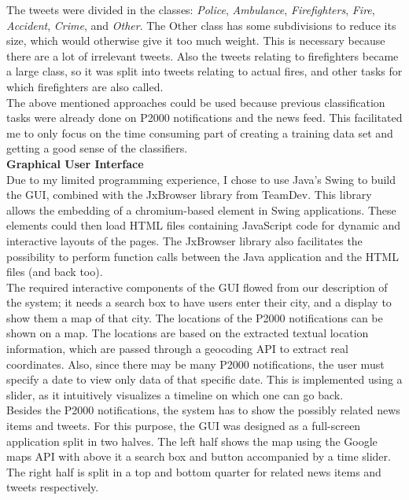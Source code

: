 The tweets were divided in the classes: \emph{Police}, \emph{Ambulance}, \emph{Firefighters}, \emph{Fire}, \emph{Accident}, \emph{Crime}, and \emph{Other}. The Other class has some subdivisions to reduce its size, which would otherwise give it too much weight. This is necessary because there are a lot of irrelevant tweets. Also the tweets relating to firefighters became a large class, so it was split into tweets relating to actual fires, and other tasks for which firefighters are also called.\\

The above mentioned approaches could be used because previous classification tasks were already done on P2000 notifications and the news feed. This facilitated me to only focus on the time consuming part of creating a training data set and getting a good sense of the classifiers.\\

\textbf{Graphical User Interface}\\
Due to my limited programming experience, I chose to use Java's Swing to build the GUI, combined with the JxBrowser library from TeamDev. This library allows the embedding of a chromium-based element in Swing applications. These elements could then load HTML files containing JavaScript code for dynamic and interactive layouts of the pages. The JxBrowser library also facilitates the possibility to perform function calls between the Java application and the HTML files (and back too).\\ 

The required interactive components of the GUI flowed from our description of the system; it needs a search box to have users enter their city, and a display to show them a map of that city. 
The locations of the P2000 notifications can be shown on a map. The locations are based on the extracted textual location information, which are passed through a geocoding API to extract real coordinates. 
Also, since there may be many P2000 notifications, the user must specify a date to view only data of that specific date. This is implemented using a slider, as it intuitively visualizes a timeline on which one can go back. \\
Besides the P2000 notifications, the system has to show the possibly related news items and tweets. For this purpose, the GUI was designed as a full-screen 
application split in two halves. The left half shows the map using the Google maps API with above it a search box and button accompanied by a time slider. The right half is split in a top and bottom quarter for related news items and tweets respectively. \\

